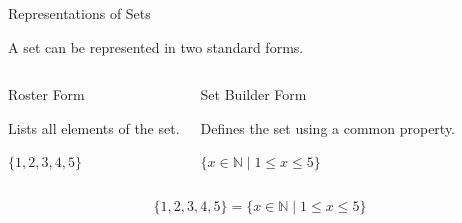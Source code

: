 \begin{frame}{Representations of Sets}

A set can be represented in two standard forms.

\vspace{0.3cm}

\begin{columns}[T,onlytextwidth]


\begin{block}{Roster Form}

Lists all elements of the set.

\begin{flushleft}
$\{1,2,3,4,5\}$
\end{flushleft}

\end{block}


\begin{block}{Set Builder Form}

Defines the set using a common property.

\begin{flushleft}
$\{x\in\mathbb N \mid 1\le x\le5\}$
\end{flushleft}

\end{block}

\end{columns}

\vspace{0.5cm}

\[
\boxed{
\{1,2,3,4,5\}
=
\{x\in\mathbb N \mid 1\le x\le5\}
}
\]

\end{frame}
